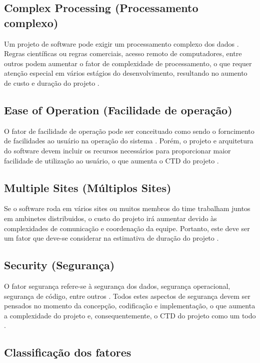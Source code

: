 \subsection{Complex Processing (Processamento complexo)}
 
 Um projeto de software pode exigir um processamento complexo dos dados \cite{bhalerao09}. Regras científicas ou regras comerciais, acesso
 remoto de computadores, entre outros podem aumentar o fator de complexidade de processamento, o que requer atenção especial em vários estágios 
 do desenvolvimento, resultando no aumento de custo e duração do projeto \cite{bhalerao09}.
 
\subsection{Ease of Operation (Facilidade de operação)}
 
 O fator de facilidade de operação pode ser conceituado como sendo o forncimento de facilidades ao usuário na operação do sistema \cite{bhalerao09}.
 Porém, o projeto e arquitetura do software devem incluir os recursos necessários para proporcionar maior facilidade de utilização ao
 usuário, o que aumenta o CTD do projeto \cite{bhalerao09}.
 
\subsection{Multiple Sites (Múltiplos Sites)}

 Se o software roda em vários sites ou muitos membros do time trabalham juntos em ambinetes distribuidos, o custo do projeto irá aumentar
 devido às complexidades de comunicação e coordenação da equipe. Portanto, este deve ser um fator que deve-se considerar na estimativa
 de duração do projeto \cite{bhalerao09}.
 
\subsection{Security (Segurança)}

 O fator segurança refere-se à segurança dos dados, segurança operacional, segurança de código, entre outros \cite{bhalerao09}. Todos estes
 aspectos de segurança devem ser pensados no momento da concepção, codificação e implementação, o que aumenta a complexidade do projeto
 e, consequentemente, o CTD do projeto como um todo \cite{bhalerao09}.
 
\subsection{Classificação dos fatores}

